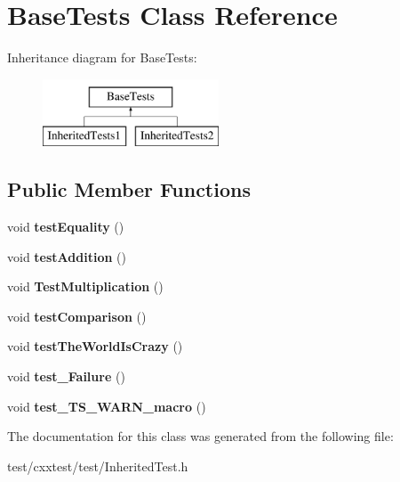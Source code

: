 \hypertarget{classBaseTests}{\section{Base\-Tests Class Reference}
\label{classBaseTests}
}
Inheritance diagram for Base\-Tests\-:\begin{figure}[H]
\begin{center}
\leavevmode
\includegraphics[height=2.000000cm]{classBaseTests}
\end{center}
\end{figure}
\subsection*{Public Member Functions}
\begin{DoxyCompactItemize}
\item 
\hypertarget{classBaseTests_aec13d99194f22f36cc61f6c0fa407fe8}{void {\bfseries test\-Equality} ()}\label{classBaseTests_aec13d99194f22f36cc61f6c0fa407fe8}

\item 
\hypertarget{classBaseTests_a8ce8ad83797fb9d7472509be6c5c67eb}{void {\bfseries test\-Addition} ()}\label{classBaseTests_a8ce8ad83797fb9d7472509be6c5c67eb}

\item 
\hypertarget{classBaseTests_aa39f9262676845274eddb1c210abf656}{void {\bfseries Test\-Multiplication} ()}\label{classBaseTests_aa39f9262676845274eddb1c210abf656}

\item 
\hypertarget{classBaseTests_ab67a5019ea16c60b70b97b1b47e46770}{void {\bfseries test\-Comparison} ()}\label{classBaseTests_ab67a5019ea16c60b70b97b1b47e46770}

\item 
\hypertarget{classBaseTests_a8b552023860f28403e31f46326377b33}{void {\bfseries test\-The\-World\-Is\-Crazy} ()}\label{classBaseTests_a8b552023860f28403e31f46326377b33}

\item 
\hypertarget{classBaseTests_a0d987da5ef5476c4fb58047698f3ecdd}{void {\bfseries test\-\_\-\-Failure} ()}\label{classBaseTests_a0d987da5ef5476c4fb58047698f3ecdd}

\item 
\hypertarget{classBaseTests_a0790e7e90128a30de493ba451ab7bdb8}{void {\bfseries test\-\_\-\-T\-S\-\_\-\-W\-A\-R\-N\-\_\-macro} ()}\label{classBaseTests_a0790e7e90128a30de493ba451ab7bdb8}

\end{DoxyCompactItemize}


The documentation for this class was generated from the following file\-:\begin{DoxyCompactItemize}
\item 
test/cxxtest/test/Inherited\-Test.\-h\end{DoxyCompactItemize}
